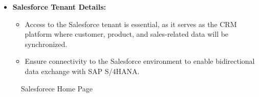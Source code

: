\begin{itemize}
\begin{figure}[H]
\end{figure}
    

    \item \textbf{Salesforce Tenant Details:}
    \begin{itemize}
        \item Access to the Salesforce tenant is essential, as it serves as the CRM platform where customer, product, and sales-related data will be synchronized.
        \item Ensure connectivity to the Salesforce environment to enable bidirectional data exchange with SAP S/4HANA.
    \end{itemize}
\end{itemize}


\begin{figure}[H]
    \centering
    \caption{Salesforece Home Page}
    
\end{figure}

